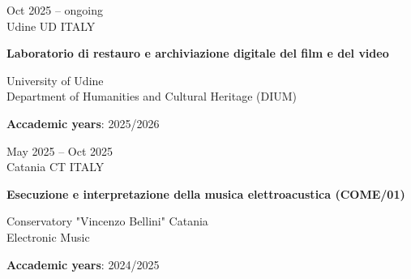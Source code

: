 \documentclass[7pt,a4paper]{article}
\begin{document}
\begin{mdframed}[
    backgroundcolor=entrygray,
    linecolor=entrygray,
    linewidth=0pt,
    innerleftmargin=6pt,
    innerrightmargin=6pt,
    innertopmargin=6pt,
    innerbottommargin=6pt,
    skipabove=0pt,
    skipbelow=0pt
]


\begin{minipage}[t]{0.28\textwidth}
\vspace{0pt}

Oct 2025 – ongoing
\\
\scriptsize Udine UD ITALY

\end{minipage}
\begin{minipage}[t]{0.68\textwidth}
\vspace{0pt}

\textbf{\normalsize Laboratorio di restauro e archiviazione digitale del film e del video}


\par University of Udine
\\\small Department of Humanities and Cultural Heritage (DIUM)





\scriptsize \textbf{Accademic years}: 2025/2026

\end{minipage}

\vspace{0.25cm}
\end{mdframed}


\begin{mdframed}[
    backgroundcolor=white,
    linecolor=white,
    linewidth=0pt,
    innerleftmargin=6pt,
    innerrightmargin=6pt,
    innertopmargin=6pt,
    innerbottommargin=6pt,
    skipabove=0pt,
    skipbelow=0pt
]


\begin{minipage}[t]{0.28\textwidth}
\vspace{0pt}

May 2025 – Oct 2025
\\
\scriptsize Catania CT ITALY

\end{minipage}
\begin{minipage}[t]{0.68\textwidth}
\vspace{0pt}

\textbf{\normalsize Esecuzione e interpretazione della musica elettroacustica (COME/01)}


\par Conservatory "Vincenzo Bellini" Catania 
\\\small Electronic Music





\scriptsize \textbf{Accademic years}: 2024/2025

\end{minipage}

\vspace{0.25cm}
\end{mdframed}
\end{document}
